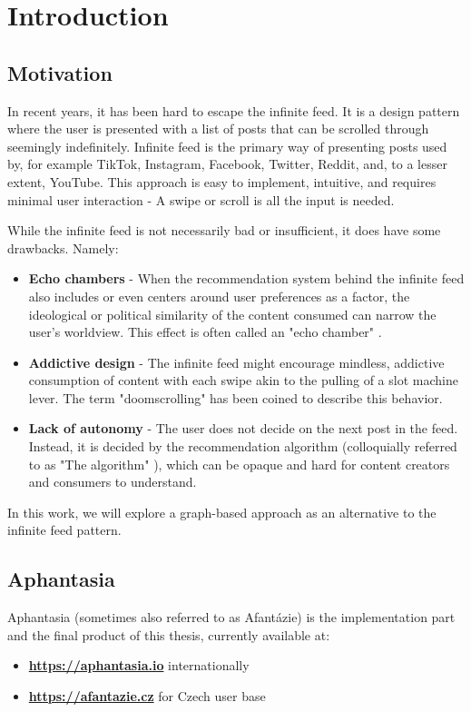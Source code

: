 \chapter*{Introduction}

\section*{Motivation}

In recent years, it has been hard to escape the infinite feed.
It is a design pattern where the user is presented with a list of posts that can be scrolled through seemingly indefinitely.
Infinite feed is the primary way of presenting posts used by, for example
TikTok, Instagram, Facebook, Twitter, Reddit, and, to a lesser extent, YouTube.
This approach is easy to implement, intuitive, and requires minimal user interaction
- A swipe or scroll is all the input is needed.

While the infinite feed is not necessarily bad or insufficient, it does have some drawbacks. Namely:
\begin{itemize}
  \item \textbf{Echo chambers}
 - When the recommendation system behind the infinite feed also includes or even centers around user preferences as a factor,
 the ideological or political similarity of the content consumed can narrow the user's worldview.
 This effect is often called an "echo chamber" \cite{echo_chamber_wiki}.
  \item \textbf{Addictive design}
 - The infinite feed might encourage mindless, addictive consumption of content with each swipe akin to the pulling of a slot machine lever.
 The term "doomscrolling" \cite{doomscrolling_wiki} has been coined to describe this behavior.
  \item \textbf{Lack of autonomy}
 - The user does not decide on the next post in the feed. Instead, it is decided by the recommendation algorithm
 (colloquially referred to as "The algorithm" \cite{the_algorithm_wikitionary}),
 which can be opaque and hard for content creators and consumers to understand.
\end{itemize}

In this work, we will explore a graph-based approach as an alternative to the infinite feed pattern.

\section*{Aphantasia}
Aphantasia (sometimes also referred to as Afantázie) is the implementation part and the final product of this thesis,
currently available at:
\begin{itemize}
  \item \textbf{\url{https://aphantasia.io}} internationally
  \item \textbf{\url{https://afantazie.cz}} for Czech user base
\end{itemize}


